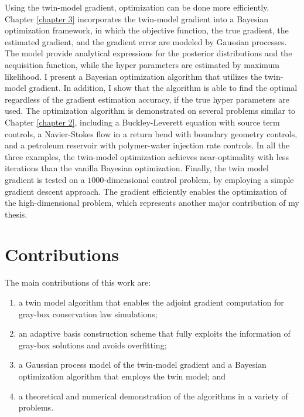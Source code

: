 Using the twin-model gradient, optimization can be done more efficiently.
Chapter \ref{chapter 3} incorporates the twin-model gradient into a Bayesian optimization framework,
in which the objective function, the true gradient,
the estimated gradient, and the gradient error are modeled by Gaussian processes.
The model provide analytical expressions for the 
posterior distributions and the acquisition function, while the 
hyper parameters are estimated by maximum likelihood.
I present a Bayesian optimization algorithm that utilizes the twin-model gradient.
In addition, I show that the algorithm is able to find the optimal regardless
of the gradient estimation accuracy, if the true hyper parameters are used.
The optimization algorithm is demonstrated on several problems similar to Chapter \ref{chapter 2},
including a Buckley-Leverett equation with source term controls,
a Navier-Stokes flow in a return bend with boundary geometry controls,
and a petroleum reservoir with polymer-water injection rate controls.
In all the three examples, the
twin-model optimization achieves
near-optimality with less iterations than the vanilla Bayesian optimization. 
Finally, the twin model gradient is tested on a
$1000$-dimensional control problem, by employing a simple gradient descent approach. 
The gradient efficiently enables the optimization of the high-dimensional problem,
which represents another major contribution of my thesis.\\


\section{Contributions}
The main contributions of this work are:
\begin{enumerate}
    \item a twin model algorithm that enables the adjoint gradient computation for gray-box
          conservation law simulations;
    \item an adaptive basis construction scheme that fully exploits the information of
          gray-box solutions and avoids overfitting;
    \item a Gaussian process model of the twin-model gradient
          and a Bayesian optimization algorithm that employs the twin model; and
    \item a theoretical and numerical demonstration of the algorithms 
          in a variety of problems.
\end{enumerate}

